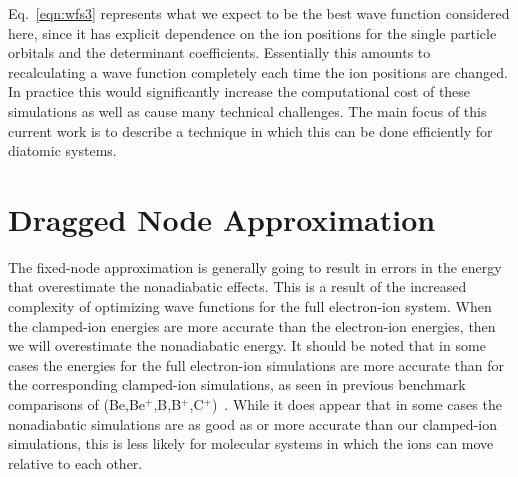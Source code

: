 \documentclass[aip,jcp,numerical,reprint]{revtex4-1}
\begin{document}
Eq.~\eqref{eqn:wfs3} represents what we expect to be the best wave function considered here, since it has explicit dependence on the ion positions for the single particle orbitals and the determinant coefficients. Essentially this amounts to recalculating a wave function completely each time the ion positions are changed.  In practice this would significantly increase the computational cost of these simulations as well as cause many technical challenges.  The main focus of this current work is to describe a technique in which this can be done efficiently for diatomic systems. 


\section{Dragged Node Approximation}


The fixed-node approximation is generally going to result in errors in the energy that overestimate the nonadiabatic effects.   This is a result of the increased complexity of optimizing wave functions for the full electron-ion system.   When the clamped-ion energies are more accurate than the electron-ion energies, then we will overestimate the nonadiabatic energy.   %
It should be noted that in some cases the energies for the full electron-ion simulations are more accurate than for the corresponding clamped-ion simulations, as seen in previous benchmark comparisons of (Be,Be$^{+}$,B,B$^{+}$,C$^{+}$)~\cite{Yang2015}.  While it does appear that in some cases the nonadiabatic simulations are as good as or more accurate than our clamped-ion simulations, this is less likely for molecular systems in which the ions can move relative to each other.    %
\end{document}
